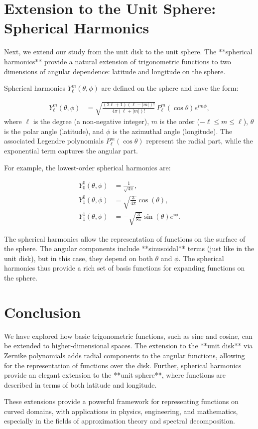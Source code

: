 \section{Extension to the Unit Sphere: Spherical Harmonics}

Next, we extend our study from the unit disk to the unit sphere. The **spherical harmonics** provide a natural extension of trigonometric functions to two dimensions of angular dependence: latitude and longitude on the sphere.

Spherical harmonics \(Y_{\ell}^{m}(\theta, \phi)\) are defined on the sphere and have the form:

\begin{equation}
\begin{split}
Y_{\ell}^{m}(\theta, \phi) &= \sqrt{\frac{(2\ell + 1)(\ell - |m|)!}{4\pi (\ell + |m|)!}} \, P_{\ell}^{m}(\cos\theta) e^{im\phi},
\end{split}
\end{equation}
where \(\ell\) is the degree (a non-negative integer), \(m\) is the order (\(-\ell \leq m \leq \ell\)), \(\theta\) is the polar angle (latitude), and \(\phi\) is the azimuthal angle (longitude). The associated Legendre polynomials \(P_{\ell}^{m}(\cos\theta)\) represent the radial part, while the exponential term captures the angular part.

For example, the lowest-order spherical harmonics are:

\begin{equation}
\begin{split}
Y_0^0(\theta, \phi) &= \frac{1}{\sqrt{4\pi}}, \\
Y_1^0(\theta, \phi) &= \sqrt{\frac{3}{4\pi}} \cos(\theta), \\
Y_1^1(\theta, \phi) &= -\sqrt{\frac{3}{8\pi}} \sin(\theta) e^{i\phi}.
\end{split}
\end{equation}

The spherical harmonics allow the representation of functions on the surface of the sphere. The angular components include **sinusoidal** terms (just like in the unit disk), but in this case, they depend on both \(\theta\) and \(\phi\). The spherical harmonics thus provide a rich set of basis functions for expanding functions on the sphere.

\section{Conclusion}

We have explored how basic trigonometric functions, such as sine and cosine, can be extended to higher-dimensional spaces. The extension to the **unit disk** via Zernike polynomials adds radial components to the angular functions, allowing for the representation of functions over the disk. Further, spherical harmonics provide an elegant extension to the **unit sphere**, where functions are described in terms of both latitude and longitude.

These extensions provide a powerful framework for representing functions on curved domains, with applications in physics, engineering, and mathematics, especially in the fields of approximation theory and spectral decomposition.
